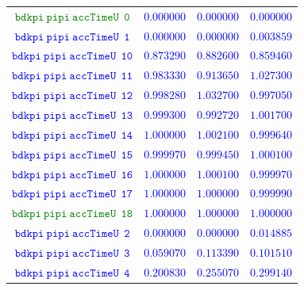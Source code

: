 \documentclass[10pt,a4paper]{article}
\begin{document}
\begin{table}[h!]
{\begin{tabular}{cccc}
\textcolor{Green}{$\mathtt{bdkpi~pipi~accTimeU~~0}$} & \textcolor{blue}{$0.000000$}& \textcolor{blue}{$0.000000$}& \textcolor{blue}{$0.000000$}\\
\textcolor{blue}{$\mathtt{bdkpi~pipi~accTimeU~~1}$} & \textcolor{blue}{$0.000000$}& \textcolor{blue}{$0.000000$}& \textcolor{blue}{$0.003859$}\\
\textcolor{blue}{$\mathtt{bdkpi~pipi~accTimeU~~10}$} & \textcolor{blue}{$0.873290$}& \textcolor{blue}{$0.882600$}& \textcolor{blue}{$0.859460$}\\
\textcolor{blue}{$\mathtt{bdkpi~pipi~accTimeU~~11}$} & \textcolor{blue}{$0.983330$}& \textcolor{blue}{$0.913650$}& \textcolor{blue}{$1.027300$}\\
\textcolor{blue}{$\mathtt{bdkpi~pipi~accTimeU~~12}$} & \textcolor{blue}{$0.998280$}& \textcolor{blue}{$1.032700$}& \textcolor{blue}{$0.997050$}\\
\textcolor{blue}{$\mathtt{bdkpi~pipi~accTimeU~~13}$} & \textcolor{blue}{$0.999300$}& \textcolor{blue}{$0.992720$}& \textcolor{blue}{$1.001700$}\\
\textcolor{blue}{$\mathtt{bdkpi~pipi~accTimeU~~14}$} & \textcolor{blue}{$1.000000$}& \textcolor{blue}{$1.002100$}& \textcolor{blue}{$0.999640$}\\
\textcolor{blue}{$\mathtt{bdkpi~pipi~accTimeU~~15}$} & \textcolor{blue}{$0.999970$}& \textcolor{blue}{$0.999450$}& \textcolor{blue}{$1.000100$}\\
\textcolor{blue}{$\mathtt{bdkpi~pipi~accTimeU~~16}$} & \textcolor{blue}{$1.000000$}& \textcolor{blue}{$1.000100$}& \textcolor{blue}{$0.999970$}\\
\textcolor{blue}{$\mathtt{bdkpi~pipi~accTimeU~~17}$} & \textcolor{blue}{$1.000000$}& \textcolor{blue}{$1.000000$}& \textcolor{blue}{$0.999990$}\\
\textcolor{Green}{$\mathtt{bdkpi~pipi~accTimeU~~18}$} & \textcolor{blue}{$1.000000$}& \textcolor{blue}{$1.000000$}& \textcolor{blue}{$1.000000$}\\
\textcolor{blue}{$\mathtt{bdkpi~pipi~accTimeU~~2}$} & \textcolor{blue}{$0.000000$}& \textcolor{blue}{$0.000000$}& \textcolor{blue}{$0.014885$}\\
\textcolor{blue}{$\mathtt{bdkpi~pipi~accTimeU~~3}$} & \textcolor{blue}{$0.059070$}& \textcolor{blue}{$0.113390$}& \textcolor{blue}{$0.101510$}\\
\textcolor{blue}{$\mathtt{bdkpi~pipi~accTimeU~~4}$} & \textcolor{blue}{$0.200830$}& \textcolor{blue}{$0.255070$}& \textcolor{blue}{$0.299140$}\\

\end{tabular}}
\end{table}
\end{document}
